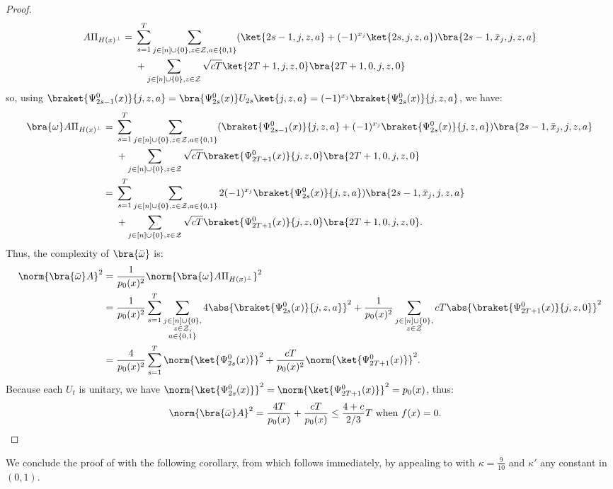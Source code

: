 \documentclass{toc}
\begin{document}
\begin{proof}
\begin{align*}
A\Pi_{H(x)^\bot} ={}& \sum_{s=1}^{T}\sum_{j\in [n]\cup\{0\},z\in{\cal Z},a\in\{0,1\}}(\ket{2s-1,j,z,a}+(-1)^{x_j}\ket{2s,j,z,a})\bra{2s-1,\bar{x}_j,j,z,a}\\
&+\sum_{j\in [n]\cup\{0\},z\in{\cal Z}}\sqrt{cT}\ket{2T+1,j,z,0}\bra{2T+1,0,j,z,0}
\end{align*}
so, using $\braket{\Psi_{2s-1}^0(x)}{j,z,a}=\bra{\Psi_{2s}^0(x)}U_{2s}\ket{j,z,a}=(-1)^{x_j}\braket{\Psi_{2s}^0(x)}{j,z,a}$, we have:
\begin{align*}
\bra{\omega}A\Pi_{H(x)^\bot} ={}& \sum_{s=1}^{T}\sum_{j\in [n]\cup\{0\},z\in{\cal Z},a\in\{0,1\}}(\braket{\Psi_{2s-1}^0(x)}{j,z,a}+(-1)^{x_j}\braket{\Psi_{2s}^0(x)}{j,z,a})\bra{2s-1,\bar{x}_j,j,z,a}\\
&+\sum_{j\in [n]\cup\{0\},z\in{\cal Z}}\sqrt{cT}\braket{\Psi_{2T+1}^0(x)}{j,z,0}\bra{2T+1,0,j,z,0}\\
={}& \sum_{s=1}^{T}\sum_{j\in [n]\cup\{0\},z\in{\cal Z},a\in\{0,1\}}2(-1)^{x_j}\braket{\Psi_{2s}^0(x)}{j,z,a})\bra{2s-1,\bar{x}_j,j,z,a}\\
&+\sum_{j\in [n]\cup\{0\},z\in{\cal Z}}\sqrt{cT}\braket{\Psi_{2T+1}^0(x)}{j,z,0}\bra{2T+1,0,j,z,0}.
\end{align*}
Thus, the complexity of $\bra{\bar\omega}$ is:
\begin{align*}
\norm{\bra{\bar{\omega}}A}^2 &= \frac{1}{p_0(x)^2}\norm{\bra{\omega}A\Pi_{H(x)^\bot}}^2\\
&= \frac{1}{p_0(x)^2}\sum_{s=1}^{T}\sum_{\substack{j\in [n]\cup\{0\},\\ z\in{\cal Z},\\ a\in\{0,1\}}}4\abs{\braket{\Psi_{2s}^0(x)}{j,z,a}}^2
+\frac{1}{p_0(x)^2}\sum_{\substack{j\in [n]\cup\{0\},\\ z\in{\cal Z}}}cT\abs{\braket{\Psi_{2T+1}^0(x)}{j,z,0}}^2\\
&= \frac{4}{p_0(x)^2}\sum_{s=1}^{T}\norm{\ket{\Psi_{2s}^0(x)}}^2 + \frac{cT}{p_0(x)^2}\norm{\ket{\Psi_{2T+1}^0(x)}}^2.
\end{align*}
Because each $U_t$ is unitary, we have $\norm{\ket{\Psi_{2s}^0(x)}}^2 = \norm{\ket{\Psi_{2T+1}^0(x)}}^2 = p_0(x)$, thus:
\begin{align*}
\norm{\bra{\bar{\omega}}A}^2 &=\frac{4T}{p_0(x)}+\frac{cT}{p_0(x)}\leq \frac{4+c}{2/3}T\mbox{ when $f(x)=0$}.\qedhere
\end{align*}
\end{proof}

We conclude the proof of  with the following corollary, from which  follows immediately, by appealing to  with $\kappa=\frac{9}{10}$ and $\kappa'$ any constant in $(0,1)$.
\end{document}
